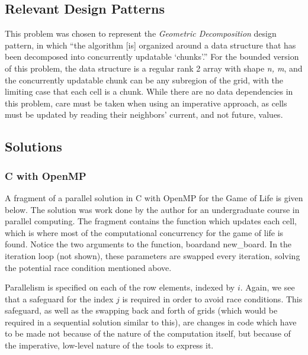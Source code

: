 \subsection{Relevant Design Patterns}
This problem was chosen to represent the \textit{Geometric Decomposition} design pattern, \cite{mass}
in which ``the algorithm [is] organized around a data structure that has been decomposed into concurrently updatable `chunks'.''
For the bounded version of this problem, 
the data structure is a regular rank 2 array with shape \textit{n, m}, 
and the concurrently updatable chunk can be any subregion of the grid, 
with the limiting case that each cell is a chunk. 
While there are no data dependencies in this problem, 
care must be taken when using an imperative approach, 
as cells must be updated by reading their neighbors' current, and not future, values.

\subsection{Solutions}
\subsubsection{C with OpenMP}
A fragment of a parallel solution in C with OpenMP for the Game of Life is given below. 
The solution was work done by the author for an undergraduate course in parallel computing.
The fragment contains the function which updates each cell, 
which is where most of the computational concurrency for the game of life is found. 
Notice the two arguments to the function, \ttfamily board\normalfont and \ttfamily new\_board\normalfont.
In the iteration loop (not shown), these parameters are swapped every iteration, 
solving the potential race condition mentioned above.

\begin{singlespacing}
\begin{small}

\end{small}
\end{singlespacing}

Parallelism is specified on each of the row elements, indexed by $i$.
Again, we see that a safeguard for the index $j$ is required in order to avoid race conditions. 
This safeguard, as well as the swapping back and forth of grids (which would be required in a sequential solution similar to this), 
are changes in code which have to be made not because of the nature of the computation itself, 
but because of the imperative, low-level nature of the tools to express it.

